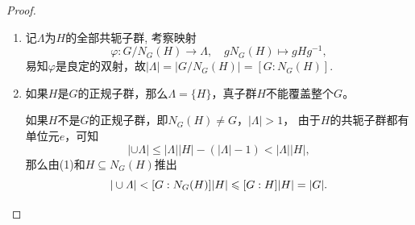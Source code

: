 \begin{enumerate}
\begin{enumerate}[label=(\arabic*)]
\end{enumerate}
\begin{proof}
    \begin{enumerate}[label=(\arabic*)]
    \item 记$\varLambda$为$H$的全部共轭子群, 考察映射
    \[\varphi:G/N_G(H)\to\varLambda,\quad gN_G(H) \mapsto gHg^{-1},\]
    易知$\varphi$是良定的双射，故$|\varLambda|=|G/N_G(H)|=[G:N_G(H)]$.
    \item 如果$H$是$G$的正规子群，那么$\varLambda=\{H\}$，真子群$H$不能覆盖整个$G$。
    
    如果$H$不是$G$的正规子群，即$N_G(H) \ne G$，$|\varLambda|>1$，
    由于$H$的共轭子群都有单位元$e$，可知
    \[|\cup\varLambda|\leqslant|\varLambda||H|-(|\varLambda|-1)<|\varLambda||H|,\]
    那么由(1)和$H \subseteq N_G(H)$推出
    \[|\cup\varLambda|<[G:N_G(H)]|H|\leqslant[G:H]|H|=|G|.\qedhere\]
    \end{enumerate}
\end{proof}
\end{enumerate}


